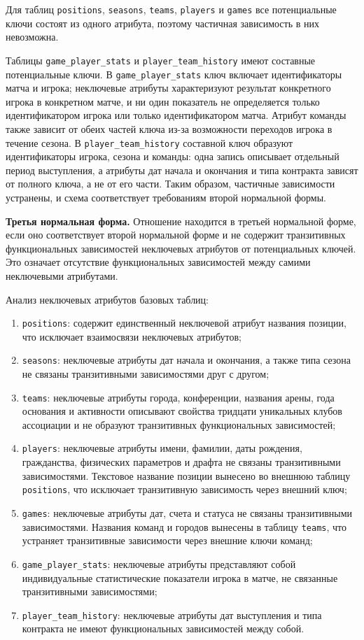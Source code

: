 Для таблиц \texttt{positions}, \texttt{seasons}, \texttt{teams}, \texttt{players} и \texttt{games} все потенциальные ключи состоят из одного атрибута, поэтому частичная зависимость в них невозможна.

Таблицы \texttt{game\_player\_stats} и \texttt{player\_team\_history} имеют составные потенциальные ключи. В \texttt{game\_player\_stats} ключ включает идентификаторы матча и игрока; неключевые атрибуты характеризуют результат конкретного игрока в конкретном матче, и ни один показатель не определяется только идентификатором игрока или только идентификатором матча. Атрибут команды также зависит от обеих частей ключа из-за возможности переходов игрока в течение сезона. В \texttt{player\_team\_history} составной ключ образуют идентификаторы игрока, сезона и команды: одна запись описывает отдельный период выступления, а атрибуты дат начала и окончания и типа контракта зависят от полного ключа, а не от его части. Таким образом, частичные зависимости устранены, и схема соответствует требованиям второй нормальной формы.

\textbf{Третья нормальная форма.} Отношение находится в третьей нормальной форме, если оно соответствует второй нормальной форме и не содержит транзитивных функциональных зависимостей неключевых атрибутов от потенциальных ключей. Это означает отсутствие функциональных зависимостей между самими неключевыми атрибутами.

Анализ неключевых атрибутов базовых таблиц:
\begin{enumerate}
    \item \texttt{positions}: содержит единственный неключевой атрибут названия позиции, что исключает взаимосвязи неключевых атрибутов;
    \item \texttt{seasons}: неключевые атрибуты дат начала и окончания, а также типа сезона не связаны транзитивными зависимостями друг с другом;
    \item \texttt{teams}: неключевые атрибуты города, конференции, названия арены, года основания и активности описывают свойства тридцати уникальных клубов ассоциации и не образуют транзитивных функциональных зависимостей;
    \item \texttt{players}: неключевые атрибуты имени, фамилии, даты рождения, гражданства, физических параметров и драфта не связаны транзитивными зависимостями. Текстовое название позиции вынесено во внешнюю таблицу \texttt{positions}, что исключает транзитивную зависимость через внешний ключ;
    \item \texttt{games}: неключевые атрибуты дат, счета и статуса не связаны транзитивными зависимостями. Названия команд и городов вынесены в таблицу \texttt{teams}, что устраняет транзитивные зависимости через внешние ключи команд;
    \item \texttt{game\_player\_stats}: неключевые атрибуты представляют собой индивидуальные статистические показатели игрока в матче, не связанные транзитивными зависимостями;
    \item \texttt{player\_team\_history}: неключевые атрибуты дат выступления и типа контракта не имеют функциональных зависимостей между собой.
\end{enumerate}

